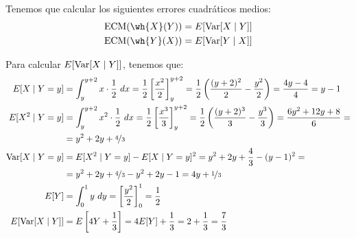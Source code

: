 \begin{ejercicio}
    Tenemos que calcular los siguientes errores cuadráticos medios:
    \begin{align*}
        \text{ECM}(\wh{X}(Y)) &= E[\Var[X\mid Y]]\\
        \text{ECM}(\wh{Y}(X)) &= E[\Var[Y\mid X]]
    \end{align*}

    Para calcular $E[\operatorname{Var}[X\mid Y]]$, tenemos que:
    \begin{align*}
        E[X\mid Y=y] &= \int_{y}^{y+2} x\cdot \dfrac{1}{2} \ dx
        = \dfrac{1}{2}\left[\dfrac{x^2}{2}\right]_{y}^{y+2}
        = \dfrac{1}{2}\left(\dfrac{(y+2)^2}{2}-\dfrac{y^2}{2}\right)
        = \dfrac{4y-4}{4} = y-1\\
        E[X^2\mid Y=y] &= \int_{y}^{y+2} x^2\cdot \dfrac{1}{2} \ dx
        = \dfrac{1}{2}\left[\dfrac{x^3}{3}\right]_{y}^{y+2}
        = \dfrac{1}{2}\left(\dfrac{(y+2)^3}{3}-\dfrac{y^3}{3}\right)
        = \dfrac{6y^2+12y+8}{6} =\\&= y^2+2y+\nicefrac{4}{3}\\
        \operatorname{Var}[X\mid Y=y] &= E[X^2\mid Y=y]-E[X\mid Y=y]^2
        = y^2+2y+\dfrac{4}{3}-(y-1)^2
        =\\&= y^2+2y+\nicefrac{4}{3}-y^2+2y-1
        = 4y+\nicefrac{1}{3}\\
        E[Y] &= \int_{0}^{1} y \ dy = \left[\dfrac{y^2}{2}\right]_{0}^{1} = \dfrac{1}{2}\\
        E[\operatorname{Var}[X\mid Y]] &= E\left[4Y+\dfrac{1}{3}\right] = 4E[Y]+\dfrac{1}{3} = 2+\dfrac{1}{3} = \dfrac{7}{3}
    \end{align*}

    \begin{comment}
    Para calcular $E[\Var[Y\mid X]]$, distinguimos en función del valor de $x$:
    \begin{itemize}
        \item Si $x\in [0,1]$, tenemos que:
        \begin{align*}
            E[Y\mid X=x] &= \int_{0}^{x} y\cdot \dfrac{1}{x} \ dy
            = \dfrac{1}{x}\left[\dfrac{y^2}{2}\right]_{0}^{x}
            = \dfrac{x}{2}\\
            E[Y^2\mid X=x] &= \int_{0}^{x} y^2\cdot \dfrac{1}{x} \ dy
            = \dfrac{1}{x}\left[\dfrac{y^3}{3}\right]_{0}^{x}
            = \dfrac{x^2}{3}\\
            \Var[Y\mid X=x] &= E[Y^2\mid X=x]-E[Y\mid X=x]^2
            = \dfrac{x^2}{3}-\left(\dfrac{x}{2}\right)^2
            = \dfrac{x^2}{12}
        \end{align*}


\end{comment}
\end{ejercicio}
